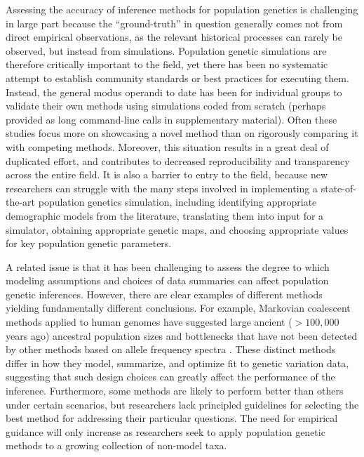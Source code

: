 \documentclass[12pt,halfline,a4paper]{ouparticle}
\begin{document}
Assessing the accuracy of inference methods for population genetics is
challenging in large part because the ``ground-truth'' in question
generally comes not from direct empirical observations, as the relevant
historical processes can rarely be observed, but instead from simulations.
Population genetic simulations are therefore critically important to the
field, yet there has been no systematic attempt to establish community
standards or best practices for executing them.
Instead, the general modus
operandi to date has been for individual groups to validate their own
methods using simulations coded from scratch
(perhaps provided as long command-line calls in supplementary material).
Often these studies focus more on showcasing a novel method than on
rigorously comparing it with competing methods.
Moreover, this situation results in a great deal of duplicated effort,
and contributes to decreased reproducibility and transparency across the entire field.
It is also a barrier to entry to the field, because new researchers can
struggle with the many steps involved
in implementing a state-of-the-art population genetics simulation,
including identifying appropriate demographic models from the literature,
translating them into input for a simulator, obtaining appropriate genetic
maps, and choosing appropriate values for key population genetic parameters.

A related issue is that it has been challenging to assess the degree to which modeling assumptions
and choices of data summaries can affect population genetic inferences.
However, there are clear examples of different methods yielding fundamentally
different conclusions. For example, Markovian coalescent methods applied to human genomes have
suggested large ancient ($>100,000$ years ago) ancestral population sizes and
bottlenecks that have not been detected by other methods based on allele frequency spectra
\citep[see][]{beichman2017comparison}.
These distinct methods differ in how they model, summarize, and optimize fit to
genetic variation data, suggesting that such design choices can greatly affect the
performance of the inference. Furthermore, some methods are likely to
perform better than others under certain scenarios, but
researchers lack principled guidelines for selecting the best method for addressing
their particular questions. The need for empirical
guidance will only increase as researchers
seek to apply population genetic methods to a growing collection of non-model taxa.
\end{document}
